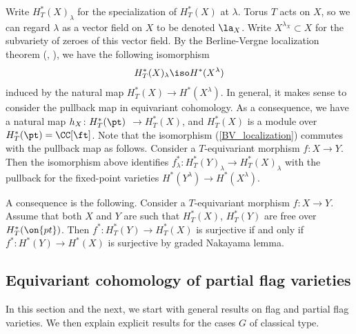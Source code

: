 \documentclass[12pt]{amsart}
\begin{document}
Write $H^{*}_T(X)_\lambda$ for the specialization of $H^*_{T}(X)$ at $\lambda$. Torus $T$ acts on $X$, so we can regard $\lambda$ as a vector field on $X$ to be denoted $\la_X$. Write $X^{\lambda_X}\subset X$ for the subvariety of zeroes of this vector field. By the Berline-Vergne localization theorem (\cite[Proposition 2.1]{Berline1985}, \cite[Sections 4,5]{Atiyah1984}), we have the following isomorphism   
\begin{equation}\label{BV_localization}
H^{*}_T(X)_\lambda \iso H^*(X^{\lambda})
\end{equation}
induced by the natural map $H^*_T(X) \rightarrow H^*(X^\lambda)$. %
In general, it makes sense to consider the pullback map in equivariant cohomology. As a consequence, we have a natural map $h_X\colon H_{T}^*(\pt)$ $\rightarrow H_{T}^*(X)$, and $H_{T}^*(X)$ is a module over $H_{T}^*(\pt) = \CC[\ft]$. 
Note that the isomorphism (\ref{BV_localization}) commutes with the pullback map as follows. Consider a $T$-equivariant morphism $f\colon X\rightarrow Y$. Then the isomorphism above identifies $f_\lambda^{*}: H^{*}_T(Y)_\lambda \rightarrow H^{*}_T(X)_\lambda$ with the pullback for the fixed-point varieties $H^*(Y^{\lambda}) \rightarrow H^*(X^{\lambda})$.



A consequence is the following. Consider a $T$-equivariant morphism $f\colon X\rightarrow Y$. Assume that both $X$ and $Y$ are such that $H_T^*(X)$, $H_T^*(Y)$ are free over $H^*_T(\on{pt})$. Then $f^{*}\colon  H^{*}_T(Y) \rightarrow H^{*}_T(X)$ is surjective if and only if $f^{*}\colon H^{*}(Y) \rightarrow H^{*}(X)$ is surjective by graded Nakayama lemma. 

\subsection{Equivariant cohomology of partial flag varieties}\label{subsec_expl_descr_equiv_partial}
In this section and the next, we start with general results on flag and partial flag varieties. We then explain explicit results for the cases $G$ of classical type.
\end{document}
